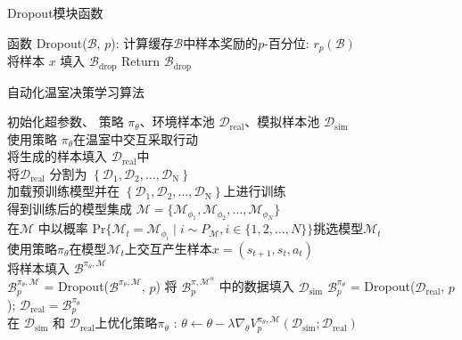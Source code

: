 \begin{algorithm}
\caption{Dropout模块函数}
\begin{algorithmic}
\STATE 函数 Dropout($\mathcal{B}$, $p$):
    \STATE 计算缓存$\mathcal{B}$中样本奖励的$p$-百分位: $r_p(\mathcal{B})$\\
            \STATE 将样本 $x$ 填入 $\mathcal{B}_{\mathrm{drop}}$
        \ENDIF
    \ENDFOR
    \STATE Return $\mathcal{B}_{\mathrm{drop}}$
\end{algorithmic}
\end{algorithm}

\begin{algorithm}
\caption{自动化温室决策学习算法}
\begin{algorithmic}
\STATE 初始化超参数、 策略 $\pi_\theta$、环境样本池 $\mathcal{D}_{\mathrm{real}}$、模拟样本池 $\mathcal{D}_{\mathrm{sim}}$\\
    \STATE 使用策略 $\pi_\theta$在温室中交互采取行动\\
    \STATE 将生成的样本填入 $\mathcal{D}_{\mathrm{real}}$中\\
    \STATE 将$\mathcal{D}_{\mathrm{real}}$ 分割为 $\left\{\mathcal{D}_{\mathrm{1}}, \mathcal{D}_{\mathrm{2}}, \ldots, \mathcal{D}_{\mathrm{N}}\right\}$\\
        \STATE 加载预训练模型并在 $\left\{\mathcal{D}_{\mathrm{1}}, \mathcal{D}_{\mathrm{2}}, \ldots, \mathcal{D}_{\mathrm{N}}\right\}$上进行训练\\
        \STATE 得到训练后的模型集成 $\mathcal{M} = \{\mathcal{M}_{\phi_1},\mathcal{M}_{\phi_2},\ldots,\mathcal{M}_{\phi_{N}}\}$\\
            \STATE 在$\mathcal{M}$ 中以概率 $\mathrm{Pr}\{\mathcal{M}_t=\mathcal{M}_{\phi_i}\mid i\sim P_{\mathcal{M}}, i\in\{1,2,\ldots,N\}\}$挑选模型$\mathcal{M}_t$\\
            \STATE 使用策略$\pi_\theta$在模型$\mathcal{M}_t$上交互产生样本$x=\left(s_{t+1},s_t,a_t\right)$ \\
            \STATE 将样本填入 $\mathcal{B}^{\pi_\theta,\mathcal{M}}$\\
        \ENDFOR
        \STATE $\mathcal{B}^{\pi_\theta,\mathcal{M}}_p$ = Dropout($\mathcal{B}^{\pi_\theta,\mathcal{M}}$, $p$)
        \STATE 将 $\mathcal{B}^{\pi,\mathcal{M}^\alpha}_p$ 中的数据填入 $\mathcal{D}_\mathrm{sim}$
    \ENDFOR
    \STATE $\mathcal{B}^{\pi_\theta}_p$ = Dropout($\mathcal{D}_{\mathrm{real}}$, $p$); $\mathcal{D}_{\mathrm{real}} = \mathcal{B}^{\pi_\theta}_p$\\
    \STATE 在 $\mathcal{D}_{\mathrm{sim}}$ 和 $\mathcal{D}_{\mathrm{real}}$上优化策略$\pi_\theta$ : $\theta\leftarrow \theta - \lambda\nabla_\theta V^{{\pi_\theta},\mathcal{M}}_p(\mathcal{D}_{\mathrm{sim}}; \mathcal{D}_{\mathrm{real}})$
\ENDFOR
\end{algorithmic}\label{algo:acml-method}
\end{algorithm}

